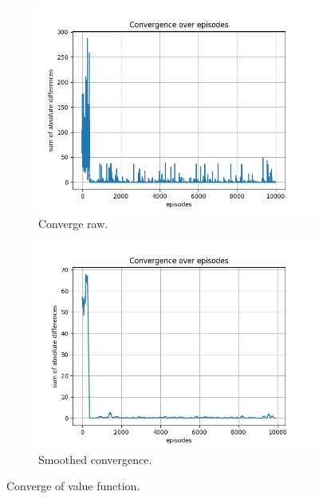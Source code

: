 \documentclass{assignment}
\begin{document}
\begin{figure}[H]
    \begin{subfigure}{0.5\textwidth}
        \includegraphics[width=\textwidth]{figures/convergence_td/alpha_sweep/convergence_TD_alpha_0.5_gamma_0.95_epislon_0.2.png}
    \caption{Converge raw.}
    \end{subfigure}\hfill
    \begin{subfigure}{0.5\textwidth}
        \includegraphics[width=\textwidth]{figures/convergence_td/alpha_sweep/convergence_TD_smoothed_alpha_0.5_gamma_0.95_epislon_0.2.png}
    \caption{Smoothed convergence.}
    \end{subfigure}
    \caption{Converge of value function.}
    \label{fig:alpha_0.5_td_learning_convergence}
\end{figure}
\end{document}
